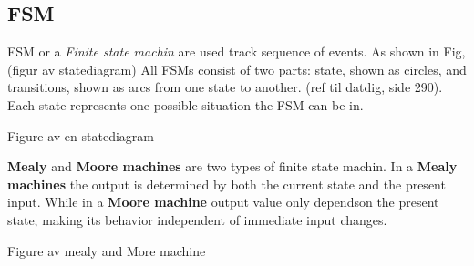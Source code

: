 \subsection{FSM} \label{FSM}
FSM or a \emph{Finite state machin} are used track sequence of events. As shown in Fig, (figur av statediagram) All FSMs consist of two parts: state, shown as circles, and transitions, shown as arcs from one state to another. (ref til datdig, side 290). Each state represents one possible situation the FSM can be in.

Figure av en statediagram

\textbf{Mealy} and \textbf{Moore machines} are two types of finite state machin. In a \textbf{Mealy machines} the output is determined by both the current state and the present input. While in a \textbf{Moore machine} output value only dependson the present state, making its behavior independent of immediate input changes.

Figure av mealy and More machine


